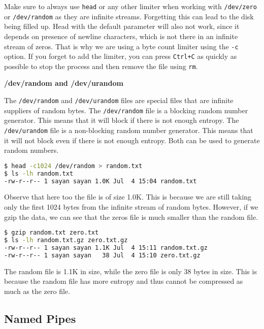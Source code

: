\begin{warn}
  Make sure to always use \lstinline|head| or any other limiter when
  working with \lstinline|/dev/zero| or \lstinline|/dev/random| as they
  are infinite streams. Forgetting this can lead to the disk being
  filled up. Head with the default parameter will also not work,
  since it depends on presence of newline characters, which is
  not there in an infinite stream of zeros. That is why we are
  using a byte count limiter using the \lstinline|-c| option.
  If you forget to add the limiter, you can press \lstinline|Ctrl+C|
  as quickly as possible to stop the process and then remove the
  file using \lstinline|rm|.
\end{warn}

\textbf{/dev/random and /dev/urandom}

The \lstinline|/dev/random| and \lstinline|/dev/urandom| files are special
files that are infinite suppliers of random bytes. The \lstinline|/dev/random|
file is a blocking random number generator. This means that it will
block if there is not enough entropy. The \lstinline|/dev/urandom| file
is a non-blocking random number generator. This means that it will
not block even if there is not enough entropy. Both can be used to
generate random numbers.

\begin{lstlisting}[language=bash]
$ head -c1024 /dev/random > random.txt
$ ls -lh random.txt
-rw-r--r-- 1 sayan sayan 1.0K Jul  4 15:04 random.txt
\end{lstlisting}

Observe that here too the file is of size 1.0K. This is because we
are still taking only the first 1024 bytes from the infinite stream
of random bytes. However, if we gzip the data, we can see that the
zeros file is much smaller than the random file.

\begin{lstlisting}[language=bash]
$ gzip random.txt zero.txt
$ ls -lh random.txt.gz zero.txt.gz
-rw-r--r-- 1 sayan sayan 1.1K Jul  4 15:11 random.txt.gz
-rw-r--r-- 1 sayan sayan   38 Jul  4 15:10 zero.txt.gz
\end{lstlisting}

The random file is 1.1K in size, while the zero file is only 38 bytes
in size. This is because the random file has more entropy and thus
cannot be compressed as much as the zero file.

\subsection{Named Pipes}

